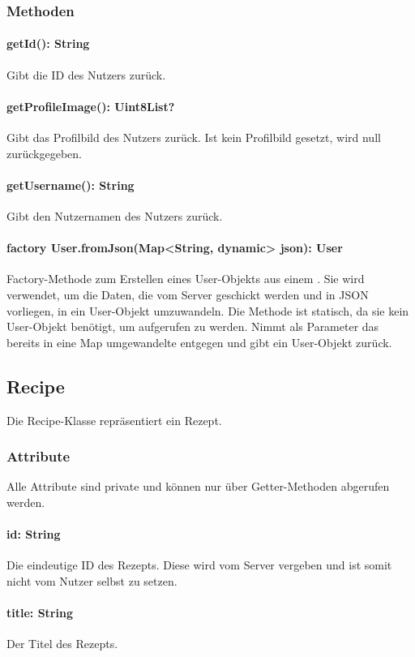 \documentclass[parskip=full]{scrartcl}
\begin{document}
\subsubsection*{Methoden}
\paragraph{getId(): String}
Gibt die ID des Nutzers zurück.
\paragraph{getProfileImage(): Uint8List?}
Gibt das Profilbild des Nutzers zurück. Ist kein Profilbild gesetzt, wird null zurückgegeben.
\paragraph{getUsername(): String}
Gibt den Nutzernamen des Nutzers zurück.
\paragraph{factory User.fromJson(Map<String, dynamic> json): User} Factory-Methode zum Erstellen eines User-Objekts aus einem . Sie wird verwendet, um die Daten, die vom Server geschickt werden und in \Gls{JSON} vorliegen, in ein User-Objekt umzuwandeln. Die Methode ist statisch, da sie kein User-Objekt benötigt, um aufgerufen zu werden. Nimmt als Parameter das bereits in eine Map umgewandelte  entgegen und gibt ein User-Objekt zurück.
\newpage

\subsection{Recipe}
Die Recipe-Klasse repräsentiert ein Rezept.
\subsubsection*{Attribute}
Alle Attribute sind private und können nur über Getter-Methoden abgerufen werden.
\paragraph{id: String}
Die eindeutige ID des Rezepts. Diese wird vom Server vergeben und ist somit nicht vom Nutzer selbst zu setzen.
\paragraph{title: String}
Der Titel des Rezepts.
\end{document}
